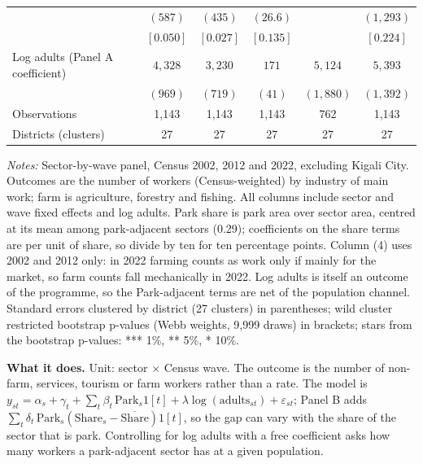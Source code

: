 \documentclass[11pt]{article}
\begin{document}
\begin{table}[H]
\begin{tabular}{lccccc}
 & $(587)$ & $(435)$ & $(26.6)$ &  & $(1,293)$ \\
 & $[0.050]$ & $[0.027]$ & $[0.135]$ &  & $[0.224]$ \\
\midrule
Log adults (Panel A coefficient) & $4,328$ & $3,230$ & $171$ & $5,124$ & $5,393$ \\
 & $(969)$ & $(719)$ & $(41)$ & $(1,880)$ & $(1,392)$ \\
Observations & 1,143 & 1,143 & 1,143 & 762 & 1,143 \\
Districts (clusters) & 27 & 27 & 27 & 27 & 27 \\
\bottomrule
\end{tabular}
\begin{minipage}{0.95\textwidth}\footnotesize
\textit{Notes:} Sector-by-wave panel, Census 2002, 2012 and 2022, excluding Kigali City. Outcomes are the number of workers (Census-weighted) by industry of main work; farm is agriculture, forestry and fishing. All columns include sector and wave fixed effects and log adults. Park share is park area over sector area, centred at its mean among park-adjacent sectors (0.29); coefficients on the share terms are per unit of share, so divide by ten for ten percentage points. Column (4) uses 2002 and 2012 only: in 2022 farming counts as work only if mainly for the market, so farm counts fall mechanically in 2022. Log adults is itself an outcome of the programme, so the Park-adjacent terms are net of the population channel. Standard errors clustered by district (27 clusters) in parentheses; wild cluster restricted bootstrap p-values (Webb weights, 9,999 draws) in brackets; stars from the bootstrap p-values: *** 1\%, ** 5\%, * 10\%.
\end{minipage}
\end{table}
\textbf{What it does.} Unit: sector $\times$ Census wave. The outcome is the number of non-farm, services, tourism or farm workers rather than a rate. The model is $y_{st} = \alpha_s + \gamma_t + \sum_t \beta_t\,\mathrm{Park}_s 1[t] + \lambda \log(\mathrm{adults}_{st}) + \varepsilon_{st}$; Panel B adds $\sum_t \delta_t\,\mathrm{Park}_s(\mathrm{Share}_s - \overline{\mathrm{Share}})1[t]$, so the gap can vary with the share of the sector that is park. Controlling for log adults with a free coefficient asks how many workers a park-adjacent sector has at a given population.
\end{document}
